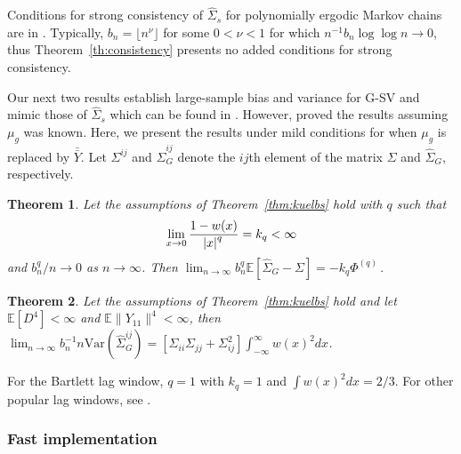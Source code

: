 \documentclass[11pt]{article}
\newcommand{\E}{\mathbb{E}}
\newcommand{\Var}{\text{Var}}
\newtheorem{theorem}{Theorem}
\theoremstyle{remark}
\begin{document}
Conditions for strong consistency of $\hat{\Sigma}_s$ for polynomially ergodic Markov chains are in \cite{vats:fleg:jon:2018}. Typically, $b_n = \lfloor n^{\nu} \rfloor$ for some $0< \nu <1$ for which $n^{-1} b_n \log \log n \to 0$, thus Theorem~\ref{th:consistency} presents no added conditions for strong consistency.

Our next two results establish large-sample bias and variance for G-SV and mimic those of $\hat{\Sigma}_s$ which can be found in \cite{hannan:1970}. However, \cite{hannan:1970} proved the results assuming $\mu_g$ was known. Here, we present the results under mild conditions for when $\mu_g$ is replaced by $\bar{\bar{Y}}$. Let $\Sigma^{ij}$ and $\hat{\Sigma}_G^{ij}$ denote the $ij$th element of the matrix $\Sigma$ and $\hat{\Sigma}_G$, respectively.

\begin{theorem}\label{th:G-SVE_bias}
Let the assumptions of Theorem~\ref{thm:kuelbs} hold with $q$ such that 
\[
\lim _{x \to 0} \dfrac{1 - w(x)}{\abs{x}^q} = k_q < \infty
\] 
and $b_n^q/n \to 0$ as $n \to \infty$. Then $ \lim_{n \to \infty}b_n^q\mathbb{E} \left[\hat{\Sigma}_{G} - \Sigma \right] = -k_q\Phi^{(q)}\,.$
\end{theorem}

\begin{theorem} \label{th:G-SVE_variance}
 Let the assumptions of Theorem~\ref{thm:kuelbs} hold and let $\E[D^4] < \infty$  and  $\E \|Y_{11}\|^4 < \infty$, then $ \lim_{n \to \infty} b_n^{-1}{n}\Var \left(\hat{\Sigma}_{G}^{ij} \right) = [\Sigma_{ii}\Sigma_{jj} + \Sigma_{ij}^2]\int_{-\infty}^{\infty}w(x)^2dx $.
\end{theorem}
For the Bartlett lag window, $q = 1$ with $k_q = 1$ and $\int w(x)^2 dx = 2/3$. For other popular lag windows, see \cite{ande:1971}.

\subsubsection{Fast implementation} %
\label{ssub:fast_implementation}
\end{document}
